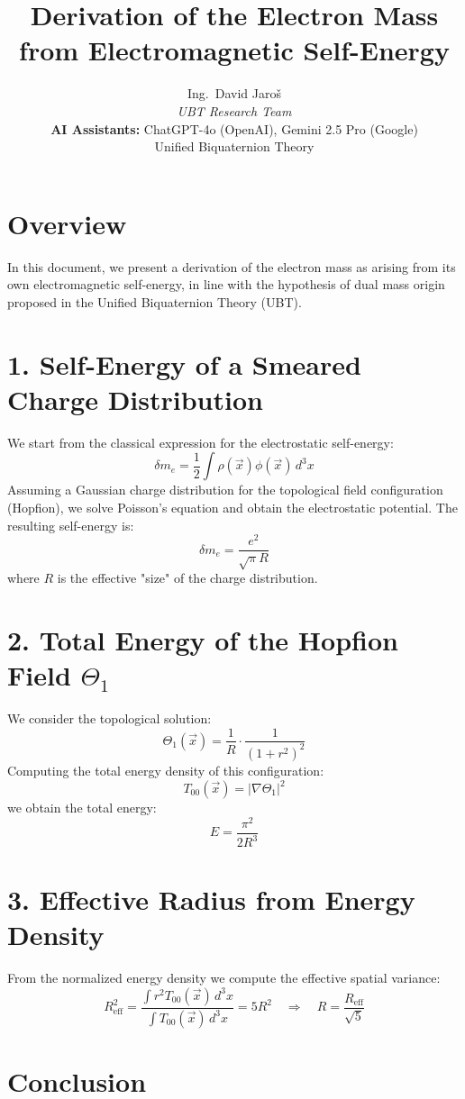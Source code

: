 \documentclass[11pt]{article}
\title{Derivation of the Electron Mass from Electromagnetic Self-Energy}
\author{
Ing.~David Jaroš \\
\textit{UBT Research Team} \\
\textbf{AI Assistants:} ChatGPT-4o (OpenAI), Gemini 2.5 Pro (Google) \\
Unified Biquaternion Theory}
\date{}
\begin{document}
\maketitle

\section*{Overview}

In this document, we present a derivation of the electron mass as arising from its own electromagnetic self-energy, in line with the hypothesis of dual mass origin proposed in the Unified Biquaternion Theory (UBT).

\section*{1. Self-Energy of a Smeared Charge Distribution}

We start from the classical expression for the electrostatic self-energy:
\[
\delta m_e = \frac{1}{2} \int \rho(\vec{x}) \phi(\vec{x})\, d^3x
\]
Assuming a Gaussian charge distribution for the topological field configuration (Hopfion), we solve Poisson's equation and obtain the electrostatic potential. The resulting self-energy is:
\[
\delta m_e = \frac{e^2}{\sqrt{\pi} R}
\]
where \( R \) is the effective "size" of the charge distribution.

\section*{2. Total Energy of the Hopfion Field \(\Theta_1\)}

We consider the topological solution:
\[
\Theta_1(\vec{x}) = \frac{1}{R} \cdot \frac{1}{(1 + r^2)^2}
\]
Computing the total energy density of this configuration:
\[
T_{00}(\vec{x}) = |\nabla \Theta_1|^2
\]
we obtain the total energy:
\[
E = \frac{\pi^2}{2 R^3}
\]

\section*{3. Effective Radius from Energy Density}

From the normalized energy density we compute the effective spatial variance:
\[
R_{\text{eff}}^2 = \frac{\int r^2 T_{00}(\vec{x})\, d^3x}{\int T_{00}(\vec{x})\, d^3x} = 5R^2
\quad \Rightarrow \quad R = \frac{R_{\text{eff}}}{\sqrt{5}}
\]

\section*{Conclusion}
\end{document}
